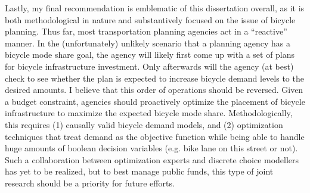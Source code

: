 Lastly, my final recommendation is emblematic of this dissertation overall, as it is both methodological in nature and substantively focused on the issue of bicycle planning. Thus far, most transportation planning agencies act in a ``reactive'' manner. In the (unfortunately) unlikely scenario that a planning agency has a bicycle mode share goal, the agency will likely first come up with a set of plans for bicycle infrastructure investment. Only afterwards will the agency (at best) check to see whether the plan is expected to increase bicycle demand levels to the desired amounts. I believe that this order of operations should be reversed. Given a budget constraint, agencies should proactively optimize the placement of bicycle infrastructure to maximize the expected bicycle mode share. Methodologically, this requires (1) causally valid bicycle demand models, and (2) optimization techniques that treat demand as the objective function while being able to handle huge amounts of boolean decision variables (e.g. bike lane on this street or not). Such a collaboration between optimization experts and discrete choice modellers has yet to be realized, but to best manage public funds, this type of joint research should be a priority for future efforts.